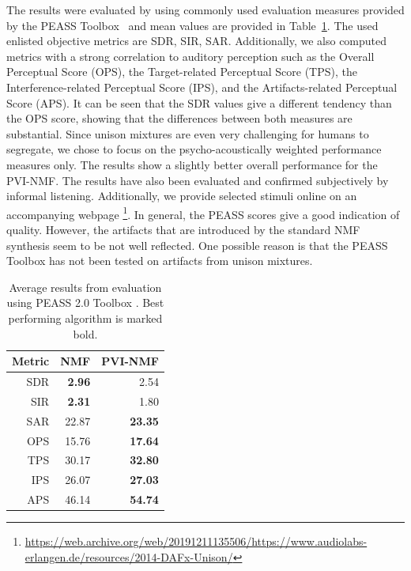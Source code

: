 The results were evaluated by using commonly used evaluation measures provided by the {PEASS} Toolbox~\cite{emiya11} and mean values are provided in Table~\ref{tab:results}.
The used enlisted objective metrics are \ac{SDR}, \ac{SIR}, \ac{SAR}. 
Additionally, we also computed metrics with a strong correlation to auditory perception such as the Overall Perceptual Score (OPS), the Target-related Perceptual Score (TPS), the Interference-related Perceptual Score (IPS), and the Artifacts-related Perceptual Score (APS).
It can be seen that the \acs{SDR} values give a different tendency than the OPS score, showing that the differences between both measures are substantial. Since unison mixtures are even very challenging for humans to segregate, we chose to focus on the psycho-acoustically weighted performance measures only. The results show a slightly better overall performance for the PVI-NMF.
The results have also been evaluated and confirmed subjectively by informal listening. Additionally, we provide selected stimuli online on an accompanying webpage \footnote{\url{https://web.archive.org/web/20191211135506/https://www.audiolabs-erlangen.de/resources/2014-DAFx-Unison/}}. 
In general, the PEASS scores give a good indication of quality. However, the artifacts that are introduced by the standard \acs{NMF} synthesis seem to be not well reflected. One possible reason is that the PEASS Toolbox has not been tested on artifacts from unison mixtures. \\

\begin{table}
\begin{center}
\small
\begin{tabular}{ r | r r }
  Metric & NMF & PVI-NMF \\
  \hline
  SDR & \textbf{2.96} & 2.54 \\
  SIR & \textbf{2.31} & 1.80 \\
  SAR & 22.87 & \textbf{23.35} \\
  \hline
  OPS & 15.76 & \textbf{17.64}\\
  TPS & 30.17 & \textbf{32.80}\\
  IPS & 26.07 & \textbf{27.03}\\
  APS & 46.14 & \textbf{54.74}\\
\end{tabular}
\end{center}
  \caption{Average results from evaluation using PEASS 2.0 Toolbox \cite{emiya11}. Best performing algorithm is marked bold.}
  \label{tab:results}
\end{table}

